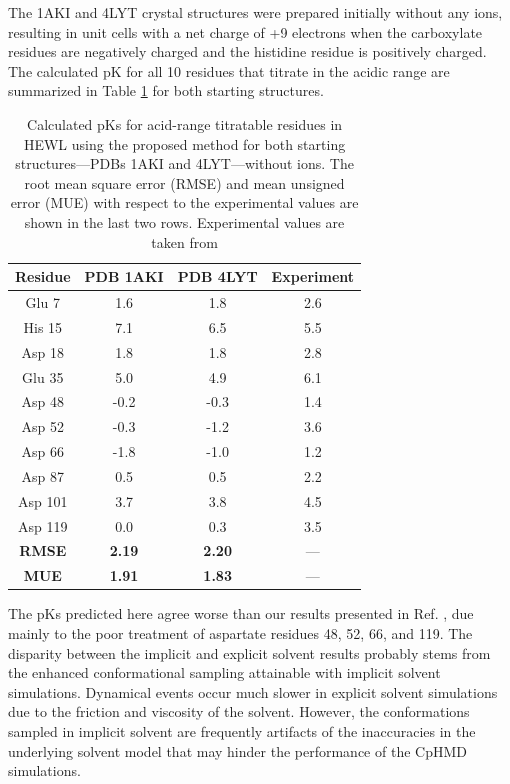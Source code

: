 The 1AKI and 4LYT crystal structures were prepared initially without any ions,
resulting in unit cells with a net charge of +9 electrons when the carboxylate
residues are negatively charged and the histidine residue is positively charged.
The calculated pK for all 10 residues that titrate in the acidic range
are summarized in Table \ref{tbl4:hewl_noions_pkas} for both starting
structures.

\begin{table}
   \caption{Calculated pKs for acid-range titratable residues in HEWL
            using the proposed method for both starting structures---PDBs 1AKI
            and 4LYT---without ions. The root mean square error (RMSE) and mean
            unsigned error (MUE) with respect to the experimental values are
            shown in the last two rows.  Experimental values are taken from
            \citeauthor{Webb_Proteins_2011_v79_p685}
            \cite{Webb_Proteins_2011_v79_p685}}
   \begin{tabular}{cccc}
      Residue & PDB 1AKI & PDB 4LYT & Experiment
                                 \cite{Webb_Proteins_2011_v79_p685} \\
      \hline
      Glu 7 & 1.6 & 1.8 & 2.6 \\
      His 15 & 7.1 & 6.5 & 5.5 \\
      Asp 18 & 1.8 & 1.8 & 2.8 \\
      Glu 35 & 5.0 & 4.9 & 6.1 \\
      Asp 48 & -0.2 & -0.3 & 1.4 \\
      Asp 52 & -0.3 & -1.2 & 3.6 \\
      Asp 66 & -1.8 & -1.0 & 1.2 \\
      Asp 87 & 0.5 & 0.5 & 2.2 \\
      Asp 101 & 3.7 & 3.8 & 4.5 \\
      Asp 119 & 0.0 & 0.3 & 3.5 \\
      \hline
      \hline
      \textbf{RMSE} & \textbf{2.19} & \textbf{2.20} & --- \\
      \textbf{MUE} & \textbf{1.91} & \textbf{1.83} & --- \\
      \hline
   \end{tabular}
   \label{tbl4:hewl_noions_pkas}
\end{table}

The pKs predicted here agree worse than our results presented in Ref.
, due mainly to the poor
treatment of aspartate residues 48, 52, 66, and 119. The disparity between the
implicit and explicit solvent results probably stems from the enhanced
conformational sampling attainable with implicit solvent simulations. Dynamical
events occur much slower in explicit solvent simulations due to the friction and
viscosity of the solvent. However, the conformations sampled in implicit solvent
are frequently artifacts of the inaccuracies in the underlying solvent model
\cite{Zhou_Proteins_2003_v53_p148, Geney_JChemTheoryComput_2006_v2_p115} that
may hinder the performance of the CpHMD simulations.
\cite{Machuqueiro_Proteins_2011_v79_p3437}

